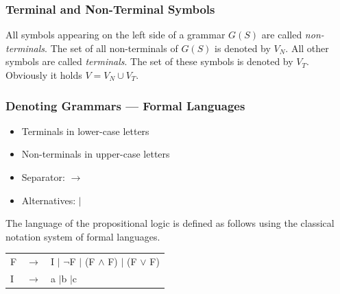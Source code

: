 \documentclass{beamer}
\theoremstyle{remark}
\newenvironment{grammar}
	{\begin{tabular}[b]{lcl}}
	{\end{tabular}}
\newcommand{\rewritten}{$\to$}
\newcommand{\alternative}{$\mid$}
\begin{document}
\begin{frame}
	\frametitle{Terminal and Non-Terminal Symbols}
	\begin{definition}
		All symbols appearing on the left side of a grammar $G(S)$ are called {\em non-terminals}. The set
		of all non-terminals of $G(S)$ is denoted by $V_N$. All other symbols are called {\em terminals}.
		The set of these symbols is denoted by $V_T$. Obviously it holds $V = V_N \cup V_T$.
	\end{definition}
\end{frame}


\begin{frame}
	\frametitle{Denoting Grammars --- Formal Languages}
	\begin {itemize}
		\item Terminals in lower-case letters
		\item Non-terminals in upper-case letters
		\item Separator: $\to$
		\item Alternatives: $\mid$
	\end{itemize}

	\pause
	
	\begin{example}
		The language of the propositional logic is defined as follows using the classical notation system
		of formal languages.
		
		\begin{grammar}
			F & \rewritten & I \alternative 
			 $\lnot$F  \alternative 
			(F $\land$ F)  \alternative 
			(F $\lor$ F) \\
			I & \rewritten & a \alternative b \alternative c
		\end{grammar}
	\end{example}
	
\end{frame}
\end{document}
